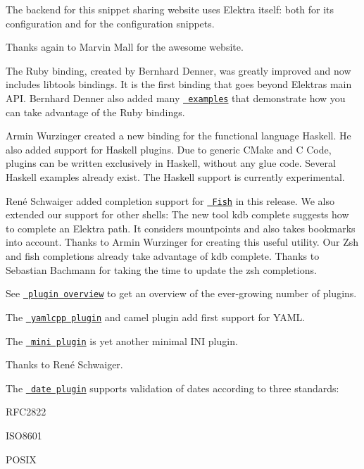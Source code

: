 The backend for this snippet sharing website uses Elektra itself\+: both for its configuration and for the configuration snippets.

Thanks again to Marvin Mall for the awesome website.

The Ruby binding, created by Bernhard Denner, was greatly improved and now includes libtools bindings. It is the first binding that goes beyond Elektra\textquotesingle{}s main A\+PI. Bernhard Denner also added many \href{https://master.libelektra.org/src/bindings/swig/ruby/examples}{\texttt{ examples}} that demonstrate how you can take advantage of the Ruby bindings.

Armin Wurzinger created a new binding for the functional language Haskell. He also added support for Haskell plugins. Due to generic C\+Make and C Code, plugins can be written exclusively in Haskell, without any glue code. Several Haskell examples already exist. The Haskell support is currently experimental.

René Schwaiger added completion support for \href{http://fishshell.com}{\texttt{ Fish}} in this release. We also extended our support for other shells\+: The new tool {\ttfamily kdb complete} suggests how to complete an Elektra path. It considers mountpoints and also takes bookmarks into account. Thanks to Armin Wurzinger for creating this useful utility. Our Zsh and fish completions already take advantage of {\ttfamily kdb complete}. Thanks to Sebastian Bachmann for taking the time to update the {\ttfamily zsh} completions.

See \href{https://www.libelektra.org/plugins/}{\texttt{ plugin overview}} to get an overview of the ever-\/growing number of plugins.

The \href{https://www.libelektra.org/plugins/yamlcpp}{\texttt{ yamlcpp plugin}} and camel plugin add first support for Y\+A\+ML.

The \href{https://www.libelektra.org/plugins/mini}{\texttt{ mini plugin}} is yet another minimal I\+NI plugin.

Thanks to René Schwaiger.

The \href{https://www.libelektra.org/plugins/date}{\texttt{ date plugin}} supports validation of dates according to three standards\+:


\begin{DoxyItemize}
\item {\ttfamily R\+F\+C2822}
\item {\ttfamily I\+S\+O8601}
\item {\ttfamily P\+O\+S\+IX}
\end{DoxyItemize}

